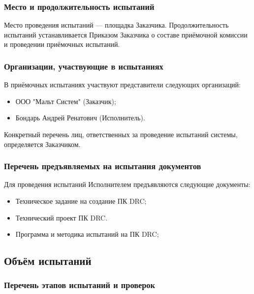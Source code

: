 \subsubsection{Место и продолжительность испытаний}

Место проведения испытаний --- площадка Заказчика.
Продолжительность испытаний устанавливается Приказом Заказчика
о составе приёмочной комиссии и проведении приёмочных испытаний.

\subsubsection{Организации, участвующие в испытаниях}

В приёмочных испытаниях участвуют представители следующих организаций:

\begin{itemize}
	\item ООО "Мальт Систем" (Заказчик);
	\item Бондарь Андрей Ренатович (Исполнитель).
\end{itemize}

Конкретный перечень лиц, ответственных за проведение испытаний системы,
определяется Заказчиком.

\subsubsection{Перечень предъявляемых на испытания документов}

Для проведения испытаний Исполнителем предъявляются следующие документы:

\begin{itemize}
	\item Техническое задание на создание ПК DRC;
	\item Технический проект ПК DRC.
	\item Программа и методика испытаний на ПК DRC;
\end{itemize}

\subsection{Объём испытаний}

\subsubsection{Перечень этапов испытаний и проверок}

